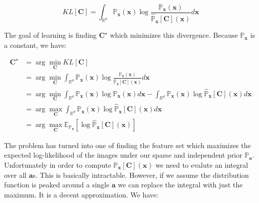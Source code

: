 \documentclass[12pt,a4paper,oneside,english]{UPBThesis}
\newcommand{\hcsignalspace}{\mathbb{R}^d}
\begin{document}
\begin{equation*}
KL[\textbf{C}] = \int_{\hcsignalspace}{\mathbb{P}_\textbf{x}(\textbf{x}) \log{\frac{\mathbb{P}_\textbf{x}(\textbf{x})}{\hat{\mathbb{P}}_\textbf{x}[\textbf{C}](\textbf{x})}} d\textbf{x}}
\end{equation*}

The goal of learning is finding $\textbf{C}^\star$ which minimizes this divergence. Because $\mathbb{P}_\textbf{x}$ is a constant, we have:

\begin{align*}
\textbf{C}^\star & = \arg\min_\textbf{C} KL[\textbf{C}] \\
& = \arg\min_\textbf{C} \int_{\hcsignalspace}{\mathbb{P}_\textbf{x}(\textbf{x}) \log{\frac{\mathbb{P}_\textbf{x}(\textbf{x})}{\hat{\mathbb{P}}_\textbf{x}[\textbf{C}](\textbf{x})}} d\textbf{x}} \\
& = \arg\min_\textbf{C} \int_{\hcsignalspace}{\mathbb{P}_\textbf{x}(\textbf{x}) \log{\mathbb{P}_\textbf{x}(\textbf{x})} d\textbf{x}} - \int_{\hcsignalspace}{\mathbb{P}_\textbf{x}(\textbf{x}) \log{\hat{\mathbb{P}}_\textbf{x}[\textbf{C}](\textbf{x})} d\textbf{x}} \\
& = \arg\max_\textbf{C} \int_{\hcsignalspace}{\mathbb{P}_\textbf{x}(\textbf{x}) \log{\hat{\mathbb{P}}_\textbf{x}[\textbf{C}](\textbf{x})} d\textbf{x}} \\
& = \arg\max_\textbf{C} \mathbb{E}_{\mathbb{P}_\textbf{x}} [ \log{\hat{\mathbb{P}}_\textbf{x}[\textbf{C}](\textbf{x})} ]
\end{align*}

The problem has turned into one of finding the feature set which maximizes the expected log-likelihood of the images under our sparse and independent prior $\mathbb{P}_\textbf{a}$. Unfortunately in order to compute $\hat{\mathbb{P}}_\textbf{x}[\textbf{C}](\textbf{x})$ we need to evalute an integral over all $\textbf{a}$s. This is basically intractable. However, if we assume the distribution function is peaked around a single $\textbf{a}$ we can replace the integral with just the maximum. It is a decent approximation. We have:
\end{document}
